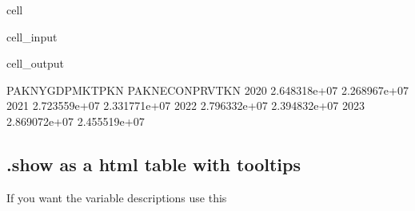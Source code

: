 \documentclass[letterpaper,10pt,english]{jupyterBook}
\begin{document}
\begin{sphinxuseclass}{cell}\begin{sphinxVerbatimInput}

\begin{sphinxuseclass}{cell_input}
\begin{sphinxVerbatim}[commandchars=\\\{\}]
\PYG{p}{[}\PYG{p}{]}
\end{sphinxVerbatim}

\end{sphinxuseclass}\end{sphinxVerbatimInput}
\begin{sphinxVerbatimOutput}

\begin{sphinxuseclass}{cell_output}
\begin{sphinxVerbatim}[commandchars=\\\{\}]
      PAKNYGDPMKTPKN  PAKNECONPRVTKN
2020    2.648318e+07    2.268967e+07
2021    2.723559e+07    2.331771e+07
2022    2.796332e+07    2.394832e+07
2023    2.869072e+07    2.455519e+07
\end{sphinxVerbatim}

\end{sphinxuseclass}\end{sphinxVerbatimOutput}

\end{sphinxuseclass}

\subsection{.show  as a html table with tooltips}
\label{\detokenize{content/Python/modelflow_features:show-as-a-html-table-with-tooltips}}
\sphinxAtStartPar
If you want the variable descriptions use this
\end{document}
